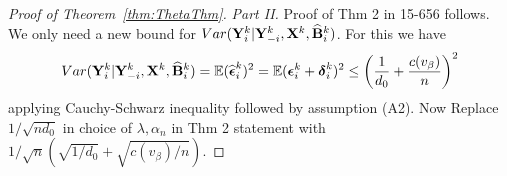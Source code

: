 \documentclass[12pt, letterpaper]{article}
\theoremstyle{definition}
\numberwithin{equation}{section}
\begin{document}
\begin{proof}[Proof of Theorem~\ref{thm:ThetaThm}]
%
%
%

\textit{Part II.} Proof of Thm 2 in 15-656 follows. We only need a new bound for $Var ({\mathbf{Y}}_i^k | {\mathbf{Y}}_{-i}^k, {\mathbf{X}}^k, \widehat {{\mathbf{B}}}_i^k)$. For this we have
%
$$ Var ({\mathbf{Y}}_i^k | {\mathbf{Y}}_{-i}^k, {\mathbf{X}}^k, \widehat {{\mathbf{B}}}_i^k) = {\mathbb{E}} (\widehat {{\boldsymbol{\epsilon}}}_i^k)^2
= {\mathbb{E}} ( {\boldsymbol{\epsilon}}_i^k + {\boldsymbol{\delta}}_i^k)^2
\leq \left( \frac{1}{d_0} + \frac{c(v_\beta)}{n} \right)^2
$$
%
applying Cauchy-Schwarz inequality followed by assumption (A2). Now Replace $1/\sqrt{n d_0}$ in choice of $\lambda, \alpha_n$ in Thm 2 statement with $1/\sqrt{n} (\sqrt{1/d_0} + \sqrt{c(v_\beta)/ n})$.

\end{proof}
\end{document}

